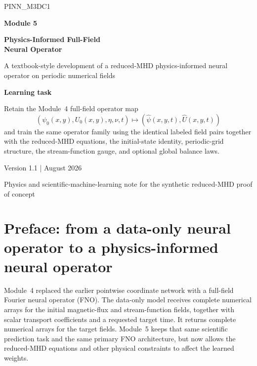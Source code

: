 \documentclass[11pt]{article}
\begin{document}
\hypersetup{pageanchor=false}

\begin{titlepage}
\centering
\vspace*{1.0cm}
{\Large\color{AccentTeal} PINN\_M3DC1}\par
\vspace{0.65cm}
{\Huge\bfseries\color{TitleBlue} Module 5}\par
\vspace{0.25cm}
{\LARGE\bfseries\color{TitleBlue} Physics-Informed Full-Field\\Neural Operator}\par
\vspace{0.8cm}
{\large A textbook-style development of a reduced-MHD physics-informed neural operator on periodic numerical fields}\par
\vfill
\begin{tcolorbox}[width=0.92\textwidth,colback=SoftBlue,colframe=TitleBlue,arc=2mm]
\centering
\textbf{Learning task}\par
\vspace{0.35em}
Retain the Module~4 full-field operator map
\[
\boxed{
\left(\psi_0(x,y),U_0(x,y),\eta,\nu,t\right)
\longmapsto
\left(\widehat\psi(x,y,t),\widehat U(x,y,t)\right)
}
\]
and train the same operator family using the identical labeled field pairs together with the reduced-MHD equations, the initial-state identity, periodic-grid structure, the stream-function gauge, and optional global balance laws.
\end{tcolorbox}
\vfill
{\normalsize Version 1.1 \quad |  August 2026}\par
\vspace{0.25cm}
{\small Physics and scientific-machine-learning note for the synthetic reduced-MHD proof of concept}\par
\end{titlepage}

\hypersetup{pageanchor=true}

\section*{Preface: from a data-only neural operator to a physics-informed neural operator}

Module~4 replaced the earlier pointwise coordinate network with a full-field Fourier neural operator (FNO). The data-only model receives complete numerical arrays for the initial magnetic-flux and stream-function fields, together with scalar transport coefficients and a requested target time. It returns complete numerical arrays for the target fields. Module~5 keeps that same scientific prediction task and the same primary FNO architecture, but now allows the reduced-MHD equations and other physical constraints to affect the learned weights.
\end{document}

